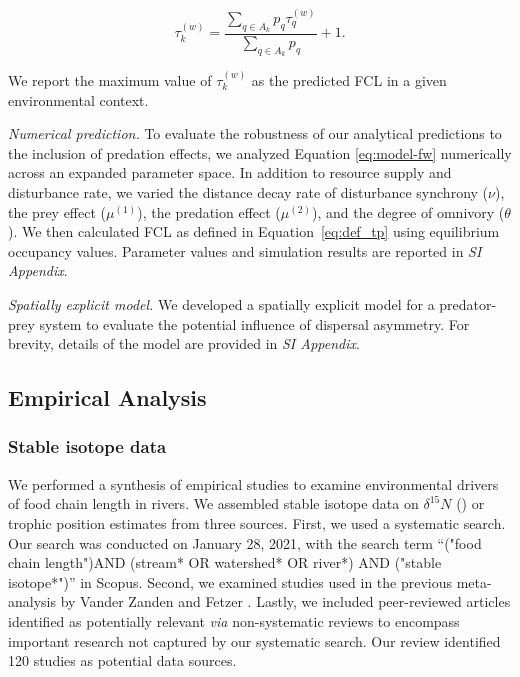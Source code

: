 \documentclass[11pt, class=article, crop=false]{standalone}
\theoremstyle{definition}
\begin{document}
\begin{equation}
    \tau^{(w)}_k = \frac{\sum_{q \in A_{k}} p_{q} \tau^{(w)}_q}{\sum_{q \in A_{k}} p_{q}} + 1.
    \label{eq:def_tp}
\end{equation}

We report the maximum value of $\tau_k^{(w)}$ as the predicted FCL in a given environmental context.

\textit{Numerical prediction.}
To evaluate the robustness of our analytical predictions to the inclusion of predation effects, we analyzed Equation \ref{eq:model-fw} numerically across an expanded parameter space. 
In addition to resource supply and disturbance rate, we varied the distance decay rate of disturbance synchrony ($\nu$), the prey effect ($\mu^{(1)}$), the predation effect ($\mu^{(2)}$), and the degree of omnivory ($\theta$). 
We then calculated FCL as defined in Equation~\ref{eq:def_tp} using equilibrium occupancy values. 
Parameter values and simulation results are reported in \textit{SI Appendix}.

\textit{Spatially explicit model.}
We developed a spatially explicit model for a predator-prey system to evaluate the potential influence of dispersal asymmetry. 
For brevity, details of the model are provided in \textit{SI Appendix}.

\subsection{Empirical Analysis}

\subsubsection{Stable isotope data}

We performed a synthesis of empirical studies to examine environmental drivers of food chain length in rivers.
We assembled stable isotope data on $\delta^{15} N$ (\textperthousand) or trophic position estimates from three sources.
First, we used a systematic search. 
Our search was conducted on January 28, 2021, with the search term ``("food chain length")AND (stream* OR watershed* OR river*) AND ("stable isotope*")'' in Scopus.
Second, we examined studies used in the previous meta-analysis by Vander Zanden and Fetzer \citep{vander_zanden_global_2007}.
Lastly, we included peer-reviewed articles identified as potentially relevant \textit{via} non-systematic reviews to encompass important research not captured by our systematic search.
Our review identified 120 studies as potential data sources.
\end{document}
